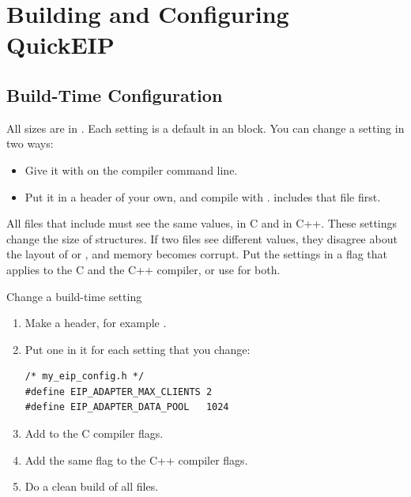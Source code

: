\chapter{Building and Configuring QuickEIP}\label{ch:build}

\section{Build-Time Configuration}\label{sec:config}

All sizes are in . Each setting is a default in an
 block. You can change a setting in two ways:

\begin{itemize}
  \item Give it with  on the compiler command line.
  \item Put it in a header of your own, and compile with
        .
         includes that file first.
\end{itemize}

\begin{caution}
All files that include  must see the same values, in C and in
C++. These settings change the size of structures. If two files see different
values, they disagree about the layout of  or
, and memory becomes corrupt. Put the settings in a flag that
applies to the C and the C++ compiler, or use  for
both.
\end{caution}

\begin{procedure}{Change a build-time setting}
\begin{enumerate}
  \item Make a header, for example .
  \item Put one  in it for each setting that you change:
\begin{lstlisting}
/* my_eip_config.h */
#define EIP_ADAPTER_MAX_CLIENTS 2
#define EIP_ADAPTER_DATA_POOL   1024
\end{lstlisting}
  \item Add 
        to the C compiler flags.
  \item Add the same flag to the C++ compiler flags.
  \item Do a clean build of all files.
\end{enumerate}
\end{procedure}

